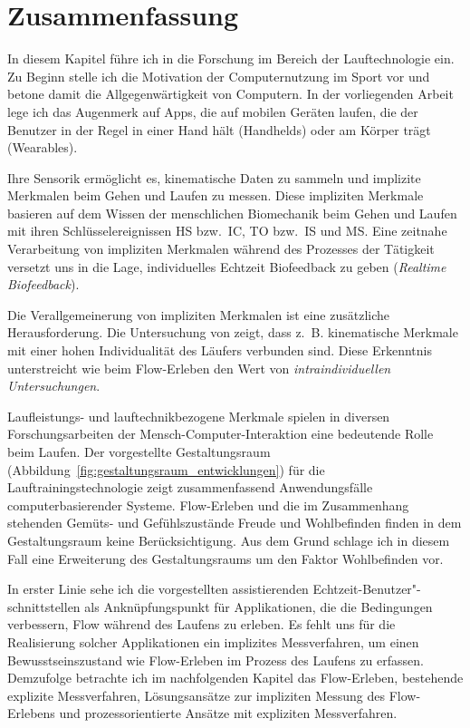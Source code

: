 

\section{Zusammenfassung} 

\label{sec:zusammenfassung_2}

In diesem Kapitel führe ich in die Forschung im Bereich der Lauftechnologie ein. Zu Beginn stelle ich die Motivation der Computernutzung im Sport vor und betone damit die Allgegenwärtigkeit von Computern. In der vorliegenden Arbeit lege ich das Augenmerk auf Apps, die auf mobilen Geräten laufen, die der Benutzer in der Regel in einer Hand hält (Handhelds) oder am Körper trägt (Wearables).

Ihre Sensorik ermöglicht es, kinematische Daten zu sammeln und implizite Merkmalen beim Gehen und Laufen zu messen. Diese impliziten Merkmale basieren auf dem Wissen der menschlichen Biomechanik beim Gehen und Laufen mit ihren Schlüsselereignissen \ac{HS} bzw.\ \ac{IC}, \ac{TO} bzw.\ \ac{IS} und \ac{MS}. Eine zeitnahe Verarbeitung von impliziten Merkmalen während des Prozesses der Tätigkeit versetzt uns in die Lage, individuelles Echtzeit Biofeedback zu geben (\emph{Realtime Biofeedback}). 

Die Verallgemeinerung von impliziten Merkmalen ist eine zusätzliche Herausforderung. Die Untersuchung von \citet{Strohrmann2012} zeigt, dass z.~B. kinematische Merkmale mit einer hohen Individualität des Läufers verbunden sind. Diese Erkenntnis unterstreicht wie beim Flow-Erleben den Wert von \emph{intraindividuellen Untersuchungen}.

Laufleistungs- und lauftechnikbezogene Merkmale spielen in diversen Forschungsarbeiten der Mensch-Computer-Interaktion eine bedeutende Rolle beim Laufen. Der vorgestellte Gestaltungsraum (Abbildung~\ref{fig:gestaltungsraum_entwicklungen}) für die Lauftrainingstechnologie zeigt zusammenfassend Anwendungsfälle computerbasierender Systeme. Flow-Erleben und die im Zusammenhang stehenden Gemüts- und Gefühlszustände Freude und Wohlbefinden finden in dem Gestaltungsraum keine Berücksichtigung. Aus dem Grund schlage ich in diesem Fall eine Erweiterung des Gestaltungsraums um den Faktor Wohlbefinden vor.

In erster Linie sehe ich die vorgestellten assistierenden Echtzeit-Benutzer"-schnittstellen als Anknüpfungspunkt für Applikationen, die die Bedingungen verbessern, Flow während des Laufens zu erleben. Es fehlt uns für die Realisierung solcher Applikationen ein implizites Messverfahren, um einen Bewusstseinszustand wie Flow-Erleben im Prozess des Laufens zu erfassen. Demzufolge betrachte ich im nachfolgenden Kapitel das Flow-Erleben, bestehende explizite Messverfahren, Lösungsansätze zur impliziten Messung des Flow-Erlebens und prozessorientierte Ansätze mit expliziten Messverfahren.

